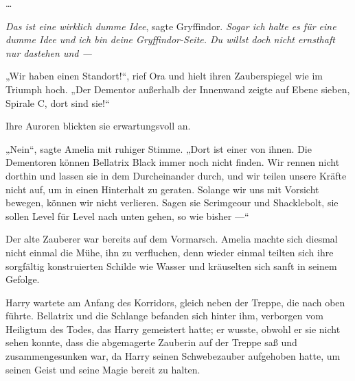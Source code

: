 …

\emph{Das ist eine wirklich dumme Idee}, sagte Gryffindor. \emph{Sogar ich halte es für eine dumme Idee und ich bin deine Gryffindor-Seite. Du willst doch nicht ernsthaft nur dastehen und —}

\later

„Wir haben einen Standort!“, rief Ora und hielt ihren Zauberspiegel wie im Triumph hoch.
„Der Dementor außerhalb der Innenwand zeigte auf Ebene sieben, Spirale C, dort sind sie!“

Ihre Auroren blickten sie erwartungsvoll an.

„Nein“, sagte Amelia mit ruhiger Stimme.
„Dort ist einer von ihnen. Die Dementoren können Bellatrix Black immer noch nicht finden. Wir rennen nicht dorthin und lassen sie in dem Durcheinander durch, und wir teilen unsere Kräfte nicht auf, um in einen Hinterhalt zu geraten. Solange wir uns mit Vorsicht bewegen, können wir nicht verlieren. Sagen sie Scrimgeour und Shacklebolt, sie sollen Level für Level nach unten gehen, so wie bisher —“

Der alte Zauberer war bereits auf dem Vormarsch. Amelia machte sich diesmal nicht einmal die Mühe, ihn zu verfluchen, denn wieder einmal teilten sich ihre sorgfältig konstruierten Schilde wie Wasser und kräuselten sich sanft in seinem Gefolge.

\later

Harry wartete am Anfang des Korridors, gleich neben der Treppe, die nach oben führte. Bellatrix und die Schlange befanden sich hinter ihm, verborgen vom Heiligtum des Todes, das Harry gemeistert hatte; er wusste, obwohl er sie nicht sehen konnte, dass die abgemagerte Zauberin auf der Treppe saß und zusammengesunken war, da Harry seinen Schwebezauber aufgehoben hatte, um seinen Geist und seine Magie bereit zu halten.

